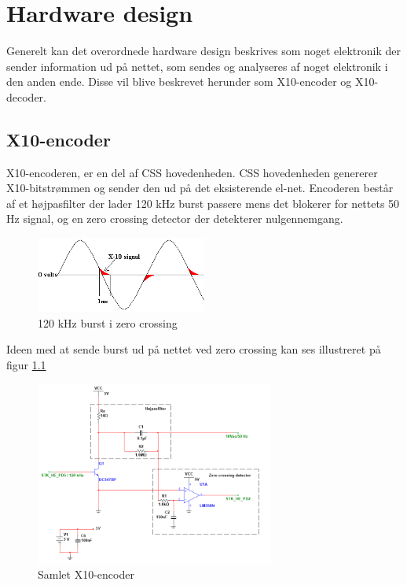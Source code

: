 \chapter{Hardware design}
Generelt kan det overordnede hardware design beskrives som noget elektronik der sender information ud på nettet, som sendes og analyseres af noget elektronik i den anden ende. Disse vil blive beskrevet herunder som X10-encoder og X10-decoder.  


\section{X10-encoder}
X10-encoderen, er en del af CSS hovedenheden. CSS hovedenheden genererer X10-bitstrømmen og sender den ud på det eksisterende el-net. Encoderen består af et højpasfilter der lader 120 kHz burst passere mens det blokerer for nettets 50 Hz signal, og en zero crossing detector der detekterer nulgennemgang.

\begin{figure}[H]
	\centering
	\includegraphics[width=0.50\textwidth]{billeder/HWdesign/X10_BURST}
	\caption{120 kHz burst i zero crossing}
	\label{fig:X10_BURST}
\end{figure}

Ideen med at sende burst ud på nettet ved zero crossing kan ses illustreret på figur \ref{fig:X10_BURST}

\begin{figure}[H]
	\centering
	\includegraphics[width=0.70\textwidth]{billeder/HWdesign/Encoder}
	\caption{Samlet X10-encoder}
	\label{fig:Encoder}
\end{figure}

